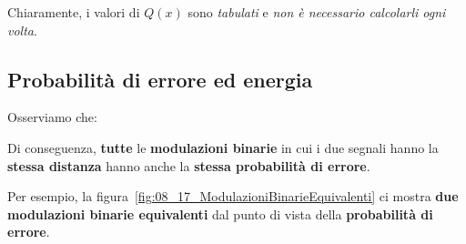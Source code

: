Chiaramente, i valori di $Q(x)$ sono \textit{tabulati} e \textit{non è necessario calcolarli ogni volta}.

\subsection{Probabilità di errore ed energia}

Osserviamo che:

\begin{remark}
    Di conseguenza, \textbf{tutte} le \textbf{modulazioni binarie} in cui i due
    segnali hanno la \textbf{stessa distanza} hanno anche la 
    \textbf{stessa probabilità di errore}.
\end{remark}

Per esempio, la figura~\ref{fig:08_17_ModulazioniBinarieEquivalenti} ci mostra
\textbf{due modulazioni binarie equivalenti} dal punto di vista della
\textbf{probabilità di errore}.

